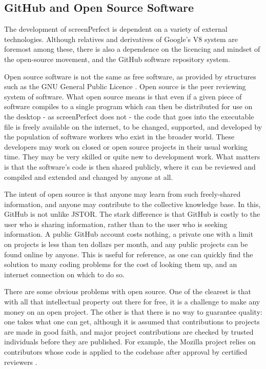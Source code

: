 \subsection{GitHub and Open Source Software}
The development of screenPerfect is dependent on a variety of external technologies. Although relatives and derivatives of Google's V8 system are foremost among these, there is also a dependence on the licencing and mindset of the open-source movement, and the GitHub software repository system.

Open source software is not the same as free software, as provided by structures such as the GNU General Public Licence . Open source is the peer reviewing system of software. What open source means is that even if a given piece of software compiles to a single program which can then be distributed for use on the desktop - as screenPerfect does not - the code that goes into the executable file is freely available on the internet, to be changed, supported, and developed by the population of software workers who exist in the broader world. These developers may work on closed or open source projects in their usual working time. They may be very skilled or quite new to development work. What matters is that the software's code is then shared publicly, where it can be reviewed and compiled and extended and changed by anyone at all.

The intent of open source is that anyone may learn from such freely-shared information, and anyone may contribute to the collective knowledge base. In this, GitHub is not unlike JSTOR. The stark difference is that GitHub is costly to the user who is sharing information, rather than to the user who is seeking information. A public GitHub account costs nothing, a private one with a limit on projects is less than ten dollars per month, and any public projects can be found online by anyone. This is useful for reference, as one can quickly find the solution to many coding problems for the cost of looking them up, and an internet connection on which to do so.

There are some obvious problems with open source. One of the clearest is that with all that intellectual property out there for free, it is a challenge to make any money on an open project. The other is that there is no way to guarantee quality: one takes what one can get, although it is assumed that contributions to projects are made in good faith, and major project contributions are checked by trusted individuals before they are published. For example, the Mozilla project relies on contributors whose code is applied to the codebase after approval by certified reviewers \parencite[URL]{mozillacontribute}. 

